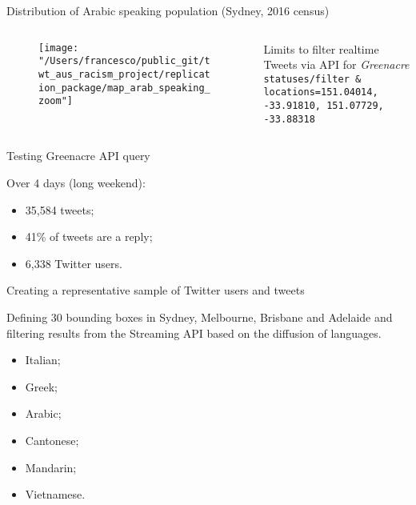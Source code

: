 \documentclass[serif, aspectratio=169]{beamer}
\begin{document}
\begin{frame}[fragile]
{Distribution of Arabic speaking population (Sydney, 2016 census)}

\begin{columns}
\begin{column}{0.7\textwidth}
\begin{figure}
\texttt{[image: "/Users/francesco/public\_git/twt\_aus\_racism\_project/replication\_package/map\_arab\_speaking\_zoom"]}
\end{figure}
\end{column}
\begin{column}{0.3\textwidth}
{\scriptsize Limits to filter realtime Tweets via API for \textit{Greenacre} \\ \tt{statuses/filter} \& \tt{locations=151.04014, -33.91810, 151.07729, -33.88318}}
\end{column}
\end{columns}

\end{frame}

\begin{frame}
{Testing Greenacre API query}

Over 4 days (long weekend):

\begin{itemize}

\item 35,584 tweets;
\item 41\% of tweets are a reply;
\item 6,338 Twitter users.

\end{itemize}

\end{frame}

\begin{frame}
{Creating a representative sample of Twitter users and tweets}

Defining 30 bounding boxes in Sydney, Melbourne, Brisbane and Adelaide and filtering results from the Streaming API based on the diffusion of languages.

\begin{itemize}

\item Italian;
\item Greek;
\item Arabic;
\item Cantonese;
\item Mandarin;
\item Vietnamese.

\end{itemize}

\end{frame}
\end{document}
